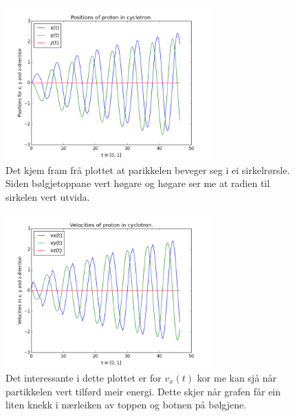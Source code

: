 \documentclass[11pt, a4paper]{article}
\begin{document}
  \begin{figure}[H]
    \centering
    \includegraphics[width=300px]{3A1.png}
    \caption{Det kjem fram frå plottet at parikkelen beveger seg i ei sirkelrørsle. Siden bølgjetoppane vert høgare og høgare ser me at radien til sirkelen vert utvida.}
  \end{figure}

  \begin{figure}[H]
    \centering
    \includegraphics[width=300px]{3A2.png}
    \caption{Det interessante i dette plottet er for $v_x(t)$ kor me kan sjå når partikkelen vert tilførd meir energi. Dette skjer når grafen får ein liten knekk i nærleiken av toppen 
    og botnen på bølgjene.}
  \end{figure}
\end{document}
